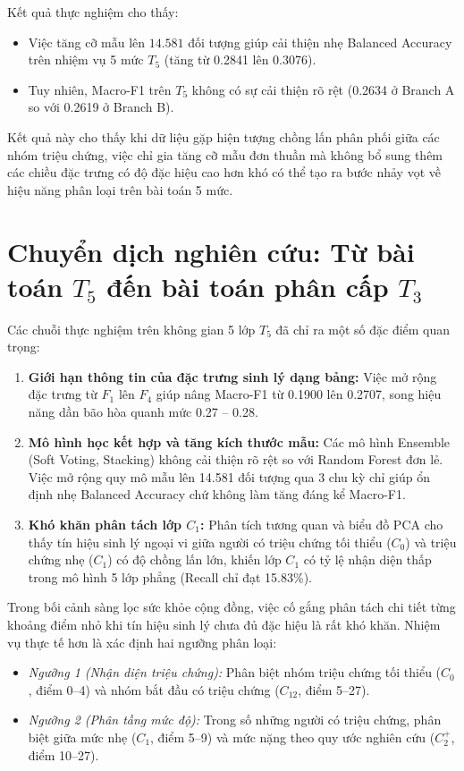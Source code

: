 Kết quả thực nghiệm cho thấy:
\begin{itemize}
    \item Việc tăng cỡ mẫu lên $14.581$ đối tượng giúp cải thiện nhẹ Balanced Accuracy trên nhiệm vụ 5 mức $T_5$ (tăng từ 0.2841 lên 0.3076).
    \item Tuy nhiên, Macro-F1 trên $T_5$ không có sự cải thiện rõ rệt (0.2634 ở Branch A so với 0.2619 ở Branch B).
\end{itemize}
Kết quả này cho thấy khi dữ liệu gặp hiện tượng chồng lấn phân phối giữa các nhóm triệu chứng, việc chỉ gia tăng cỡ mẫu đơn thuần mà không bổ sung thêm các chiều đặc trưng có độ đặc hiệu cao hơn khó có thể tạo ra bước nhảy vọt về hiệu năng phân loại trên bài toán 5 mức.

\section{Chuyển dịch nghiên cứu: Từ bài toán $T_5$ đến bài toán phân cấp $T_3$}
\label{sec:chuyen-dich-t5-t3}

Các chuỗi thực nghiệm trên không gian 5 lớp $T_5$ đã chỉ ra một số đặc điểm quan trọng:
\begin{enumerate}
    \item \textbf{Giới hạn thông tin của đặc trưng sinh lý dạng bảng:} Việc mở rộng đặc trưng từ $F_1$ lên $F_4$ giúp nâng Macro-F1 từ 0.1900 lên 0.2707, song hiệu năng dần bão hòa quanh mức 0.27 -- 0.28.
    \item \textbf{Mô hình học kết hợp và tăng kích thước mẫu:} Các mô hình Ensemble (Soft Voting, Stacking) không cải thiện rõ rệt so với Random Forest đơn lẻ. Việc mở rộng quy mô mẫu lên 14.581 đối tượng qua 3 chu kỳ chỉ giúp ổn định nhẹ Balanced Accuracy chứ không làm tăng đáng kể Macro-F1.
    \item \textbf{Khó khăn phân tách lớp $C_1$:} Phân tích tương quan và biểu đồ PCA cho thấy tín hiệu sinh lý ngoại vi giữa người có triệu chứng tối thiểu ($C_0$) và triệu chứng nhẹ ($C_1$) có độ chồng lấn lớn, khiến lớp $C_1$ có tỷ lệ nhận diện thấp trong mô hình 5 lớp phẳng (Recall chỉ đạt 15.83\%).
\end{enumerate}

Trong bối cảnh sàng lọc sức khỏe cộng đồng, việc cố gắng phân tách chi tiết từng khoảng điểm nhỏ khi tín hiệu sinh lý chưa đủ đặc hiệu là rất khó khăn. Nhiệm vụ thực tế hơn là xác định hai ngưỡng phân loại:
\begin{itemize}
    \item \textit{Ngưỡng 1 (Nhận diện triệu chứng):} Phân biệt nhóm triệu chứng tối thiểu ($C_0$, điểm 0--4) và nhóm bắt đầu có triệu chứng ($C_{12}$, điểm 5--27).
    \item \textit{Ngưỡng 2 (Phân tầng mức độ):} Trong số những người có triệu chứng, phân biệt giữa mức nhẹ ($C_1$, điểm 5--9) và mức nặng theo quy ước nghiên cứu ($C_2^+$, điểm 10--27).
\end{itemize}

